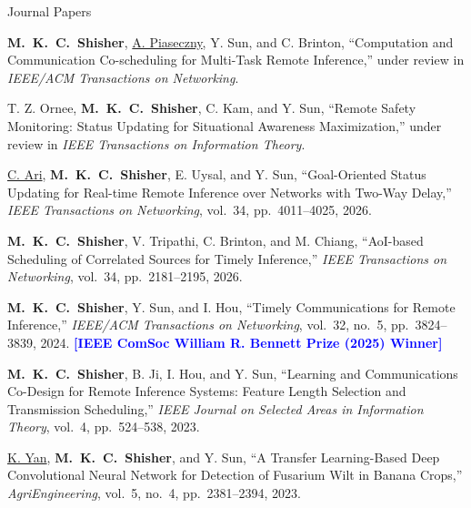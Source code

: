 \documentclass[10pt,letterpaper]{article}
\newcommand{\cvsubsection}[1]{\par
  \ifnum\lastpenalty=10000 \else\addvspace{8pt}\needspace{3\baselineskip}\fi
  \noindent #1\par\nobreak\addvspace{6pt}}
\newenvironment{publist}[2]{%
  \def\pubtotal{#2}%
  \begin{enumerate}[label={[#1\revpubnum]},
                    leftmargin=2.6em,labelwidth=2.3em,labelsep=0.3em,align=left,
                    itemsep=3pt,topsep=2pt,parsep=0pt]}%
  {\end{enumerate}}
\newcommand{\me}{\textbf{M.~K.~C.~Shisher}}      %
\newcommand{\mentee}[1]{\underline{#1}}          %
\newcommand{\note}[1]{\textcolor{blue}{\textbf{[#1]}}}  %
\begin{document}
\cvsubsection{Journal Papers}
\begin{publist}{J}{7}
  \item \me, \mentee{A. Piaseczny}, Y. Sun, and C. Brinton,
        ``Computation and Communication Co-scheduling for Multi-Task Remote Inference,''
        under review in \emph{IEEE/ACM Transactions on Networking}.
  \item T. Z. Ornee, \me, C. Kam, and Y. Sun,
        ``Remote Safety Monitoring: Status Updating for Situational Awareness Maximization,''
        under review in \emph{IEEE Transactions on Information Theory}.
  \item \mentee{C. Ari}, \me, E. Uysal, and Y. Sun,
        ``Goal-Oriented Status Updating for Real-time Remote Inference over Networks with
        Two-Way Delay,'' \emph{IEEE Transactions on Networking}, vol.~34, pp.~4011--4025, 2026.
  \item \me, V. Tripathi, C. Brinton, and M. Chiang,
        ``AoI-based Scheduling of Correlated Sources for Timely Inference,''
        \emph{IEEE Transactions on Networking}, vol.~34, pp.~2181--2195, 2026.
  \item \me, Y. Sun, and I. Hou,
        ``Timely Communications for Remote Inference,''
        \emph{IEEE/ACM Transactions on Networking}, vol.~32, no.~5, pp.~3824--3839, 2024.
        \note{IEEE ComSoc William R. Bennett Prize (2025) Winner}
  \item \me, B. Ji, I. Hou, and Y. Sun,
        ``Learning and Communications Co-Design for Remote Inference Systems: Feature Length
        Selection and Transmission Scheduling,'' \emph{IEEE Journal on Selected Areas in
        Information Theory}, vol.~4, pp.~524--538, 2023.
  \item \mentee{K. Yan}, \me, and Y. Sun,
        ``A Transfer Learning-Based Deep Convolutional Neural Network for Detection of
        Fusarium Wilt in Banana Crops,'' \emph{AgriEngineering}, vol.~5, no.~4,
        pp.~2381--2394, 2023.
\end{publist}
\end{document}
